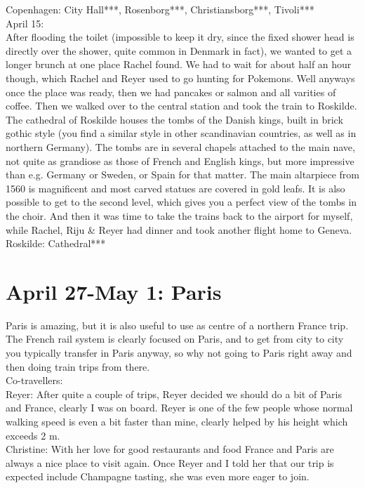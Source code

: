 Copenhagen: City Hall***,  Rosenborg***, Christiansborg***, Tivoli***\\

April 15:\\
After flooding the toilet (impossible to keep it dry, since the fixed shower head is directly over the shower, quite common in Denmark in fact), we wanted to get a longer brunch at one place Rachel found. We had to wait for about half an hour though, which Rachel and Reyer used to go hunting for Pokemons. Well anyways once the place was ready, then we had pancakes or salmon and all varities of coffee. Then we walked over to the central station and took the train to Roskilde. The cathedral of Roskilde houses the tombs of the Danish kings, built in brick gothic style (you find a similar style in other scandinavian countries, as well as in northern Germany). The tombs are in several chapels attached to the main nave, not quite as grandiose as those of French and English kings, but more impressive than e.g. Germany or Sweden, or Spain for that matter. The main altarpiece from 1560 is magnificent and most carved statues are covered in gold leafs. It is also possible to get to the second level, which gives you a perfect view of the tombs in the choir. And then it was time to take the trains back to the airport for myself, while Rachel, Riju \& Reyer had dinner and took another flight home to Geneva.\\

Roskilde: Cathedral***

\section{April 27-May 1: Paris}
\label{2018:Paris}

Paris is amazing, but it is also useful to use as centre of a northern France trip. The French rail system is clearly focused on Paris, and to get from city to city you typically transfer in Paris anyway, so why not going to Paris right away and then doing train trips from there.\\

Co-travellers:\\
Reyer: After quite a couple of trips, Reyer decided we should do a bit of Paris and France, clearly I was on board. Reyer is one of the few people whose normal walking speed is even a bit faster than mine, clearly helped by his height which exceeds 2 m.\\
Christine: With her love for good restaurants and food France and Paris are always a nice place to visit again. Once Reyer and I told her that our trip is expected include Champagne tasting, she was even more eager to join.\\

